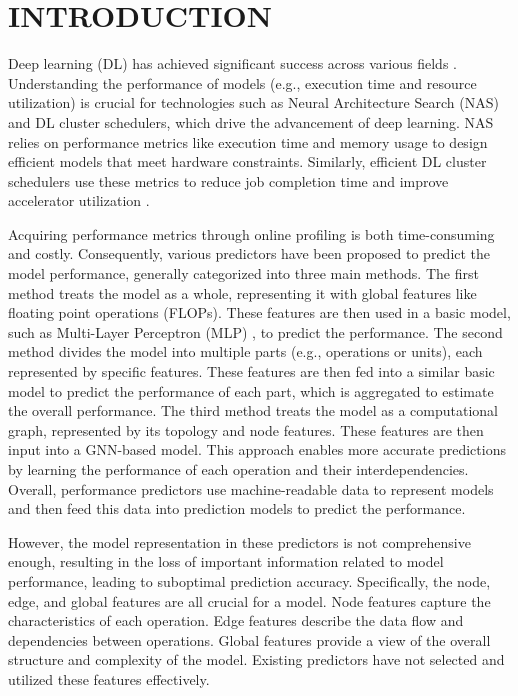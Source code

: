 \section{INTRODUCTION}
Deep learning (DL) has achieved significant success across various fields \cite{RNN,cnn}. Understanding the performance of models (e.g., execution time and resource utilization) is crucial for technologies such as Neural Architecture Search (NAS) and DL cluster schedulers, which drive the advancement of deep learning.
NAS relies on performance metrics like execution time \cite{Brp-nas,latencyaware-nas} and memory usage \cite{sas-nas,micronets-nas} to design efficient models that meet hardware constraints. Similarly, efficient DL cluster schedulers use these metrics to reduce job completion time and improve accelerator utilization \cite{Liquid,Horus}.

Acquiring performance metrics through online profiling is both time-consuming and costly. Consequently, various predictors have been proposed to predict the model performance, generally categorized into three main methods.
The first method \cite{Liquid,Horus} treats the model as a whole, representing it with global features like floating point operations (FLOPs). These features are then used in a basic model, such as Multi-Layer Perceptron (MLP) \cite{mlp}, to predict the performance.
The second method \cite{justus,Nn-meter} divides the model into multiple parts (e.g., operations or units), each represented by specific features. These features are then fed into a similar basic model to predict the performance of each part, which is aggregated to estimate the overall performance.
The third method \cite{Brp-nas,dnnperf,DIPPM,PerfSAGE} treats the model as a computational graph, represented by its topology and node features. These features are then input into a GNN-based model. This approach enables more accurate predictions by learning the performance of each operation and their interdependencies.
Overall, 
performance predictors use machine-readable data to represent models and then feed this data into prediction models to predict the performance.

However, the model representation in these predictors is not comprehensive enough, resulting in the loss of important information related to model performance, leading to suboptimal prediction accuracy.
Specifically, the node, edge, and global features are all crucial for a model. Node features capture the characteristics of each operation. Edge features describe the data flow and dependencies between operations. Global features provide a view of the overall structure and complexity of the model.
Existing predictors have not selected and utilized these features effectively. 

